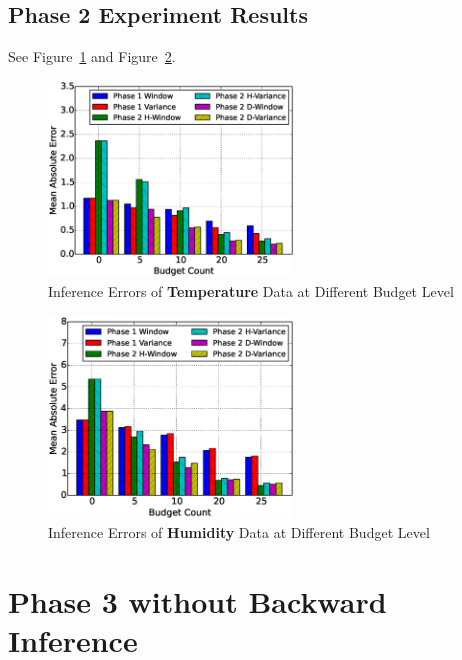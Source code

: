 \documentclass[12pt]{article}  %
\theoremstyle{definition}
\theoremstyle{remark}
\begin{document}
\subsection{Phase 2 Experiment Results}
\label{sec:phase2:result}
See Figure~\ref{fig:phase2:temperature} and Figure~\ref{fig:phase2:humidity}.

\begin{figure}[H]
\centering
        \includegraphics[width=0.58\textwidth]{../phase2/temperature_err}
        \caption{Inference Errors of \textbf{Temperature} Data at Different Budget Level}
\label{fig:phase2:temperature}
\end{figure}

\begin{figure}[H]
\centering
        \includegraphics[width=0.58\textwidth]{../phase2/humidity_err}
        \caption{Inference Errors of \textbf{Humidity} Data at Different Budget Level}
\label{fig:phase2:humidity}
\end{figure}


\section{Phase 3 without Backward Inference}
\end{document}
